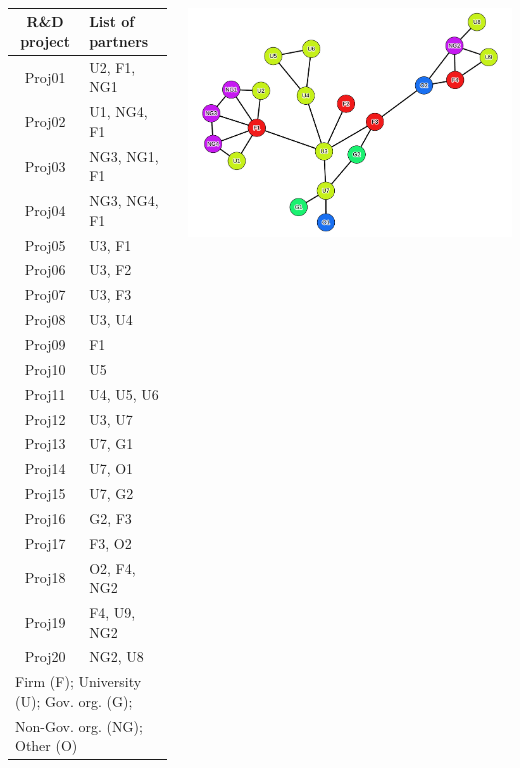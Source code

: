 \documentclass[8pt]{beamer}
\begin{document}
\begin{frame}
\frametitle{\insertsection}
\framesubtitle{\insertsubsection}

\begin{columns}


\centering
\footnotesize
\begin{table}
\begin{tabular}{cl}
\bottomrule
\textbf{R\&D project} & \textbf{List of partners}\\
\hline
Proj01          & U2, F1, NG1\\
Proj02          & U1, NG4, F1\\
Proj03          & NG3, NG1, F1\\
Proj04          & NG3, NG4, F1\\
Proj05          & U3, F1\\
Proj06          & U3, F2\\
Proj07          & U3, F3\\
Proj08          & U3, U4\\
Proj09          & F1\\
Proj10          & U5\\
Proj11          & U4, U5, U6\\
Proj12          & U3, U7\\
Proj13          & U7, G1\\
Proj14          & U7, O1\\
Proj15          & U7, G2\\
Proj16          & G2, F3\\
Proj17          & F3, O2\\
Proj18          & O2, F4, NG2\\
Proj19          & F4, U9, NG2\\
Proj20          & NG2, U8\\
\bottomrule
\multicolumn{2}{l}{\tiny Firm (F); University (U); Gov. org. (G);}\\
\multicolumn{2}{l}{\tiny Non-Gov. org. (NG); Other (O)}
\end{tabular}
\end{table}



\includegraphics[width=\linewidth]{exercise_gephi}


\end{columns}
\end{frame}
\end{document}

